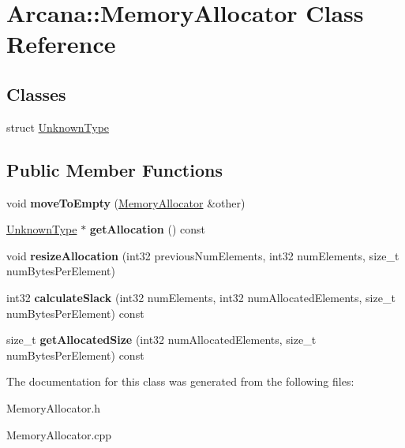 \hypertarget{class_arcana_1_1_memory_allocator}{}\section{Arcana\+:\+:Memory\+Allocator Class Reference}
\label{class_arcana_1_1_memory_allocator}
\subsection*{Classes}
\begin{DoxyCompactItemize}
\item 
struct \mbox{\hyperlink{struct_arcana_1_1_memory_allocator_1_1_unknown_type}{Unknown\+Type}}
\end{DoxyCompactItemize}
\subsection*{Public Member Functions}
\begin{DoxyCompactItemize}
\item 
\mbox{\label{class_arcana_1_1_memory_allocator_ad666f3a8253e8db9014312ea9e31f938}} 
void {\bfseries move\+To\+Empty} (\mbox{\hyperlink{class_arcana_1_1_memory_allocator}{Memory\+Allocator}} \&other)
\item 
\mbox{\label{class_arcana_1_1_memory_allocator_a663af3a3a9eaa69f783c0b54fa151ec6}} 
\mbox{\hyperlink{struct_arcana_1_1_memory_allocator_1_1_unknown_type}{Unknown\+Type}} $\ast$ {\bfseries get\+Allocation} () const
\item 
\mbox{\label{class_arcana_1_1_memory_allocator_abd738971dc3566995442e1ad3a11950a}} 
void {\bfseries resize\+Allocation} (int32 previous\+Num\+Elements, int32 num\+Elements, size\+\_\+t num\+Bytes\+Per\+Element)
\item 
\mbox{\label{class_arcana_1_1_memory_allocator_afd95c3951e887361cc76954db1e7197a}} 
int32 {\bfseries calculate\+Slack} (int32 num\+Elements, int32 num\+Allocated\+Elements, size\+\_\+t num\+Bytes\+Per\+Element) const
\item 
\mbox{\label{class_arcana_1_1_memory_allocator_ab162927b3e2a3c594ac21f8cc1491cca}} 
size\+\_\+t {\bfseries get\+Allocated\+Size} (int32 num\+Allocated\+Elements, size\+\_\+t num\+Bytes\+Per\+Element) const
\end{DoxyCompactItemize}


The documentation for this class was generated from the following files\+:\begin{DoxyCompactItemize}
\item 
Memory\+Allocator.\+h\item 
Memory\+Allocator.\+cpp\end{DoxyCompactItemize}

